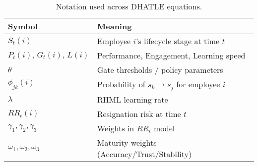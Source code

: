 \begin{table}[t]
\centering
\caption{Notation used across DHATLE equations.}
\begin{tabular}{ll}
\toprule
Symbol & Meaning \\
\midrule
$S_t(i)$ & Employee $i$'s lifecycle stage at time $t$ \\
$P_t(i),\,G_t(i),\,L(i)$ & Performance, Engagement, Learning speed \\
$\theta$ & Gate thresholds / policy parameters \\
$\phi_{jk}(i)$ & Probability of $s_k \to s_j$ for employee $i$ \\
$\lambda$ & RHML learning rate \\
$RR_t(i)$ & Resignation risk at time $t$ \\
$\gamma_1,\gamma_2,\gamma_3$ & Weights in $RR_t$ model \\
$\omega_1,\omega_2,\omega_3$ & Maturity weights (Accuracy/Trust/Stability) \\
\bottomrule
\end{tabular}
\end{table}
